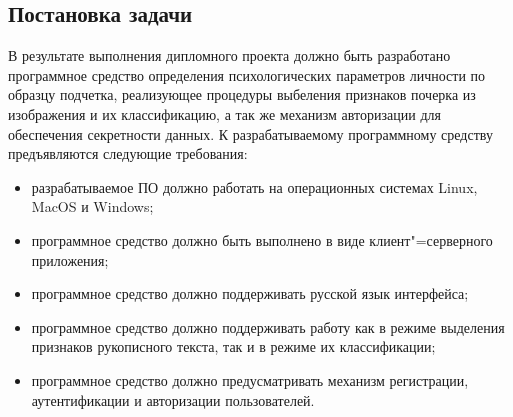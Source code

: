 \subsection{Постановка задачи}
В результате выполнения дипломного проекта должно быть разработано программное средство определения психологических параметров личности по образцу подчетка, реализующее процедуры выбеления признаков почерка из изображения и их классификацию, а так же механизм авторизации для обеспечения секретности данных. К разрабатываемому программному средству предъявляются следующие требования:
\begin{itemize}
\item разрабатываемое ПО должно работать на операционных системах Linux, MacOS и Windows;
\item программное средство должно быть выполнено в виде клиент"=серверного приложения;
\item программное средство должно поддерживать русской язык интерфейса;
\item программное средство должно поддерживать работу как в режиме выделения признаков рукописного текста, так и в режиме их классификации;
\item программное средство должно предусматривать механизм регистрации, аутентификации и авторизации пользователей.
\end{itemize}
